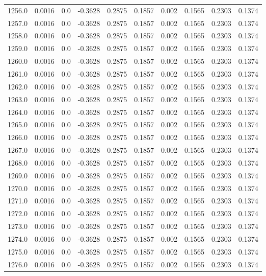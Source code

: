 \begin{longtable}{lrrrrrrrrr}
1256.0 & 0.0016 & 0.0 & -0.3628 & 0.2875 & 0.1857 & 0.002 & 0.1565 & 0.2303 & 0.1374 \\
1257.0 & 0.0016 & 0.0 & -0.3628 & 0.2875 & 0.1857 & 0.002 & 0.1565 & 0.2303 & 0.1374 \\
1258.0 & 0.0016 & 0.0 & -0.3628 & 0.2875 & 0.1857 & 0.002 & 0.1565 & 0.2303 & 0.1374 \\
1259.0 & 0.0016 & 0.0 & -0.3628 & 0.2875 & 0.1857 & 0.002 & 0.1565 & 0.2303 & 0.1374 \\
1260.0 & 0.0016 & 0.0 & -0.3628 & 0.2875 & 0.1857 & 0.002 & 0.1565 & 0.2303 & 0.1374 \\
1261.0 & 0.0016 & 0.0 & -0.3628 & 0.2875 & 0.1857 & 0.002 & 0.1565 & 0.2303 & 0.1374 \\
1262.0 & 0.0016 & 0.0 & -0.3628 & 0.2875 & 0.1857 & 0.002 & 0.1565 & 0.2303 & 0.1374 \\
1263.0 & 0.0016 & 0.0 & -0.3628 & 0.2875 & 0.1857 & 0.002 & 0.1565 & 0.2303 & 0.1374 \\
1264.0 & 0.0016 & 0.0 & -0.3628 & 0.2875 & 0.1857 & 0.002 & 0.1565 & 0.2303 & 0.1374 \\
1265.0 & 0.0016 & 0.0 & -0.3628 & 0.2875 & 0.1857 & 0.002 & 0.1565 & 0.2303 & 0.1374 \\
1266.0 & 0.0016 & 0.0 & -0.3628 & 0.2875 & 0.1857 & 0.002 & 0.1565 & 0.2303 & 0.1374 \\
1267.0 & 0.0016 & 0.0 & -0.3628 & 0.2875 & 0.1857 & 0.002 & 0.1565 & 0.2303 & 0.1374 \\
1268.0 & 0.0016 & 0.0 & -0.3628 & 0.2875 & 0.1857 & 0.002 & 0.1565 & 0.2303 & 0.1374 \\
1269.0 & 0.0016 & 0.0 & -0.3628 & 0.2875 & 0.1857 & 0.002 & 0.1565 & 0.2303 & 0.1374 \\
1270.0 & 0.0016 & 0.0 & -0.3628 & 0.2875 & 0.1857 & 0.002 & 0.1565 & 0.2303 & 0.1374 \\
1271.0 & 0.0016 & 0.0 & -0.3628 & 0.2875 & 0.1857 & 0.002 & 0.1565 & 0.2303 & 0.1374 \\
1272.0 & 0.0016 & 0.0 & -0.3628 & 0.2875 & 0.1857 & 0.002 & 0.1565 & 0.2303 & 0.1374 \\
1273.0 & 0.0016 & 0.0 & -0.3628 & 0.2875 & 0.1857 & 0.002 & 0.1565 & 0.2303 & 0.1374 \\
1274.0 & 0.0016 & 0.0 & -0.3628 & 0.2875 & 0.1857 & 0.002 & 0.1565 & 0.2303 & 0.1374 \\
1275.0 & 0.0016 & 0.0 & -0.3628 & 0.2875 & 0.1857 & 0.002 & 0.1565 & 0.2303 & 0.1374 \\
1276.0 & 0.0016 & 0.0 & -0.3628 & 0.2875 & 0.1857 & 0.002 & 0.1565 & 0.2303 & 0.1374 \\

\end{longtable}
